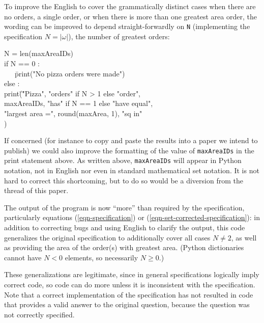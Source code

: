 \documentclass[11pt]{article}
\begin{document}
To improve the English to cover the grammatically distinct cases when there are no orders, a single order, or when there is more than one greatest area order, the wording can be improved to depend straight-forwardly on \texttt{N} (implementing the specification $N=|\omega|$), the number of greatest orders:

{\tt\begin{tabbing}
N = len(maxAreaIDs)\\
if N == 0 : \\
\ \ \ \=print("No pizza orders were made")\\
else :\\
      \> print\=(\="Pizza", "orders" if N > 1 else "order", \\
	  \>      \>\>maxAreaIDs, "has" if N == 1 else "have equal",\\
	  \>      \>\>"largest area =", round(maxArea, 1), "sq in"\\
	  \>      \>)
\end{tabbing}}

If concerned (for instance to copy and paste the results into a paper we intend to publish) we could also improve the formatting of the value of \texttt{maxAreaIDs} in the print statement above. As written above, \texttt{maxAreaIDs} will appear in Python notation, not in English nor even in standard mathematical set notation. It is not hard to correct this shortcoming, but to do so would be a diversion from the thread of this paper.

The output of the program is now ``more'' than required by the specification, particularly equations (\ref{eqn-specification}) or (\ref{eqn-set-corrected-specification}): in addition to correcting bugs and using English to clarify the output, this code generalizes the original specification to additionally cover all cases $N \ne 2$, as well as providing the area of the order(s) with greatest area. (Python dictionaries cannot have $N<0$ elements, so necessarily $N\ge0$.) 

These generalizations are legitimate, since in general specifications logically imply correct code, so code can do more unless it is inconsistent with the specification. Note that a correct implementation of the specification has not resulted in code that provides a valid answer to the original question, because the question was not correctly specified.
\end{document}
